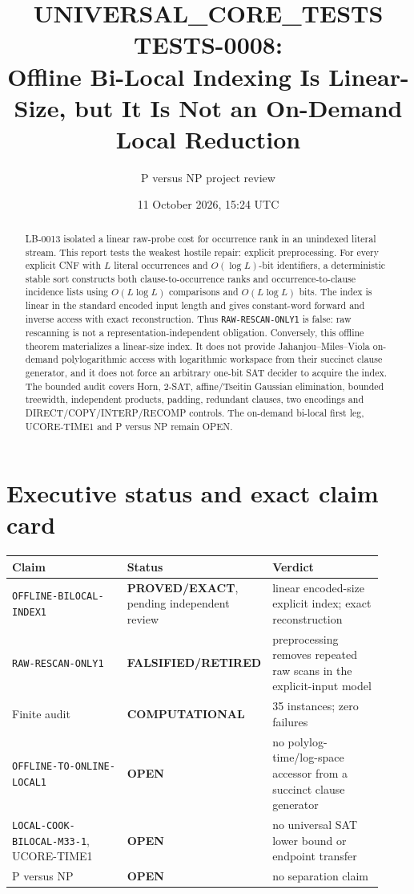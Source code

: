 \documentclass[11pt]{article}
\title{UNIVERSAL\_CORE\_TESTS TESTS-0008:\\
Offline Bi-Local Indexing Is Linear-Size, but It Is Not an On-Demand Local Reduction}
\author{P versus NP project review}
\date{11 October 2026, 15:24 UTC}
\newcommand{\EXACT}{\textbf{PROVED/EXACT}}
\newcommand{\COMP}{\textbf{COMPUTATIONAL}}
\newcommand{\OPEN}{\textbf{OPEN}}
\newcommand{\RETIRED}{\textbf{FALSIFIED/RETIRED}}
\begin{document}
\maketitle

\begin{abstract}
LB-0013 isolated a linear raw-probe cost for occurrence rank in an unindexed
literal stream.  This report tests the weakest hostile repair: explicit
preprocessing.  For every explicit CNF with $L$ literal occurrences and
$O(\log L)$-bit identifiers, a deterministic stable sort constructs both
clause-to-occurrence ranks and occurrence-to-clause incidence lists using
$O(L\log L)$ comparisons and $O(L\log L)$ bits.  The index is linear in the
standard encoded input length and gives constant-word forward and inverse
access with exact reconstruction.  Thus \texttt{RAW-RESCAN-ONLY1} is false:
raw rescanning is not a representation-independent obligation.  Conversely,
this offline theorem materializes a linear-size index.  It does not provide
Jahanjou--Miles--Viola on-demand polylogarithmic access with logarithmic
workspace from their succinct clause generator, and it does not force an
arbitrary one-bit SAT decider to acquire the index.  The bounded audit covers
Horn, 2-SAT, affine/Tseitin Gaussian elimination, bounded treewidth,
independent products, padding, redundant clauses, two encodings and
DIRECT/COPY/INTERP/RECOMP controls.  The on-demand bi-local first leg,
UCORE-TIME1 and P versus NP remain OPEN.
\end{abstract}

\section{Executive status and exact claim card}

\begin{center}\footnotesize
\begin{tabular}{@{}p{0.39\linewidth}p{0.19\linewidth}p{0.34\linewidth}@{}}
\toprule Claim & Status & Verdict\\ \midrule
\texttt{OFFLINE-BILOCAL-INDEX1} & \EXACT, pending independent review &
linear encoded-size explicit index; exact reconstruction\\
\texttt{RAW-RESCAN-ONLY1} & \RETIRED & preprocessing removes repeated raw
scans in the explicit-input model\\
Finite audit & \COMP & 35 instances; zero failures\\
\texttt{OFFLINE-TO-ONLINE-LOCAL1} & \OPEN & no polylog-time/log-space
accessor from a succinct clause generator\\
\texttt{LOCAL-COOK-BILOCAL-M33-1}, UCORE-TIME1 & \OPEN & no universal
SAT lower bound or endpoint transfer\\
P versus NP & \OPEN & no separation claim\\
\bottomrule
\end{tabular}
\end{center}
\end{document}
